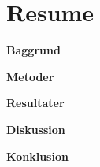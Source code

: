 \section*{Resume}
\textbf{Baggrund}

\blindtext

\textbf{Metoder}

\blindtext

\textbf{Resultater}

\blindtext

\textbf{Diskussion}


\textbf{Konklusion}
